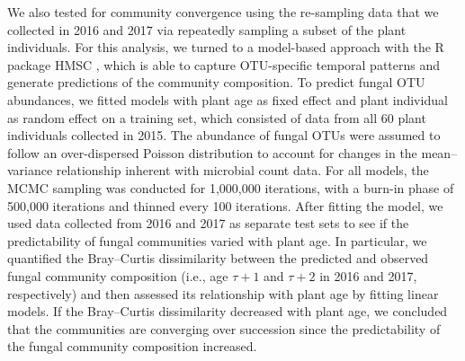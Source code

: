 We also tested for community convergence using the re-sampling data that we collected in 2016 and 2017 via repeatedly sampling a subset of the plant individuals. 
For this analysis, we turned to a model-based approach with the R package HMSC \citep{Ovaskainen2017}, which is able to capture OTU-specific temporal patterns and generate predictions of the community composition. 
To predict fungal OTU abundances, we fitted models with plant age as fixed effect and plant individual as random effect on a training set, which consisted of data from all 60 plant individuals collected in 2015. The abundance of fungal OTUs were assumed to follow an over-dispersed Poisson distribution to account for changes in the mean--variance relationship inherent with microbial count data. For all models, the MCMC sampling was conducted for 1,000,000 iterations, with a burn-in phase of 500,000 iterations and thinned every 100 iterations. 
After fitting the model, we used data collected from 2016 and 2017 as separate test sets to see if the predictability of fungal communities varied with plant age. 
In particular, we quantified the Bray--Curtis dissimilarity between the predicted and observed fungal community composition (i.e., age $\tau + 1$ and $\tau + 2$ in 2016 and 2017, respectively) and then assessed its relationship with plant age by fitting linear models. 
If the Bray--Curtis dissimilarity decreased with plant age, we concluded that the communities are converging over succession since the predictability of the fungal community composition increased. 
\par



